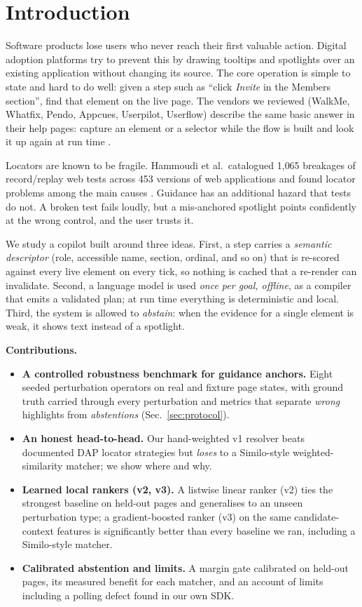 \documentclass[conference]{IEEEtran}
\begin{document}
\section{Introduction}\label{sec:intro}
Software products lose users who never reach their first valuable action. Digital adoption platforms try to prevent this by drawing tooltips and spotlights over an existing application without changing its source. The core operation is simple to state and hard to do well: given a step such as ``click \emph{Invite} in the Members section'', find that element on the live page. The vendors we reviewed (WalkMe, Whatfix, Pendo, Appcues, Userpilot, Userflow) describe the same basic answer in their help pages: capture an element or a selector while the flow is built and look it up again at run time \cite{walkme_what,pendo_css,appcues_selectors,userpilot_select,userflow_tooltip}.

Locators are known to be fragile. Hammoudi et al.\ catalogued 1{,}065 breakages of record/replay web tests across 453 versions of web applications and found locator problems among the main causes \cite{hammoudi2016}. Guidance has an additional hazard that tests do not. A broken test fails loudly, but a mis-anchored spotlight points confidently at the wrong control, and the user trusts it.

We study a copilot built around three ideas. First, a step carries a \emph{semantic descriptor} (role, accessible name, section, ordinal, and so on) that is re-scored against every live element on every tick, so nothing is cached that a re-render can invalidate. Second, a language model is used \emph{once per goal, offline}, as a compiler that emits a validated plan; at run time everything is deterministic and local. Third, the system is allowed to \emph{abstain}: when the evidence for a single element is weak, it shows text instead of a spotlight.

\textbf{Contributions.}
\begin{itemize}
\item \textbf{A controlled robustness benchmark for guidance anchors.} Eight seeded perturbation operators on \nPages{} real and fixture page states, with ground truth carried through every perturbation and metrics that separate \emph{wrong} highlights from \emph{abstentions} (Sec.~\ref{sec:protocol}).
\item \textbf{An honest head-to-head.} Our hand-weighted v1 resolver beats documented DAP locator strategies but \emph{loses} to a Similo-style weighted-similarity matcher; we show where and why.
\item \textbf{Learned local rankers (v2, v3).} A listwise linear ranker (v2) ties the strongest baseline on held-out pages and generalises to an unseen perturbation type; a gradient-boosted ranker (v3) on the same candidate-context features is significantly better than every baseline we ran, including a Similo-style matcher.
\item \textbf{Calibrated abstention and limits.} A margin gate calibrated on held-out pages, its measured benefit for each matcher, and an account of limits including a polling defect found in our own SDK.
\end{itemize}
\end{document}
